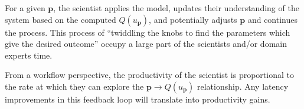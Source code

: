 \documentclass[a4paper,fontsize=12pt]{scrartcl}
\begin{document}
For a given $\mathbf{p}$, the
scientist applies the model, updates their understanding of the system
based on the computed $Q(u_{\mathbf{p}})$, and potentially adjusts
$\mathbf{p}$ and continues the process. This process of ``twiddling
the knobs to find the parameters which give the desired outcome''
occupy a large part of the scientists and/or domain experts time.

From a workflow perspective, the productivity of the scientist is
proportional to the rate at which they can explore the
$\mathbf{p} \rightarrow Q(u_{\mathbf{p}})$ relationship. Any latency
improvements in this feedback loop will translate into
productivity gains.
\end{document}
